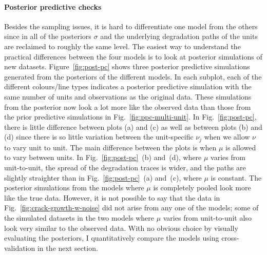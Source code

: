 \paragraph{Posterior predictive checks} Besides the sampling issues, it is hard to differentiate one model from the others since in all of the posteriors $\sigma$ and the underlying degradation paths of the units are reclaimed to roughly the same level. The easiest way to understand the practical differences between the four models is to look at posterior simulations of new datasets. Figure~\ref{fig:post-pc} shows three posterior predictive simulations generated from the posteriors of the different models. In each subplot, each of the different colours/line types indicates a posterior predictive simulation with the same number of units and observations as the original data. These simulations from the posterior now look a lot more like the observed data than those from the prior predictive simulations in Fig.~\ref{fig:ppc-multi-unit}. In Fig.~\ref{fig:post-pc}, there is little difference between plots (a) and (c) as well as between plots (b) and (d) since there is so little variation between the unit-specific $\nu_j$ when we allow $\nu$ to vary unit to unit. The main difference between the plots is when $\mu$ is allowed to vary between units. In Fig.~\ref{fig:post-pc}~(b) and~(d), where $\mu$ varies from unit-to-unit, the spread of the degradation traces is wider, and the paths are slightly straighter than in Fig.~\ref{fig:post-pc}~(a) and~(c), where $\mu$ is constant. The posterior simulations from the models where $\mu$ is completely pooled look more like the true data. However, it is not possible to say that the data in Fig.~\ref{fig:crack-growth-w-noise} did not arise from any one of the models; some of the simulated datasets in the two models where $\mu$ varies from unit-to-unit also look very similar to the observed data. With no obvious choice by visually evaluating the posteriors, I quantitatively compare the models using cross-validation in the next section.


